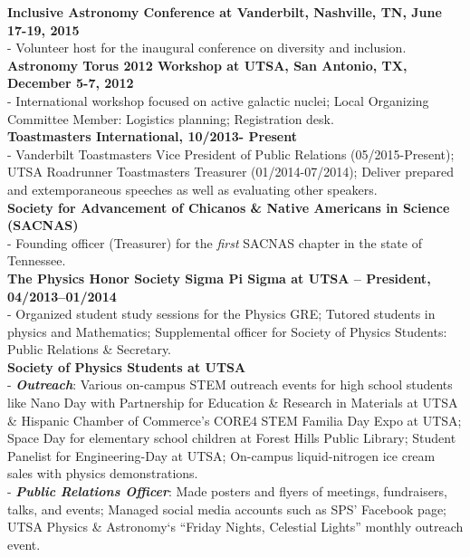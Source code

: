 \documentclass[letter,11pt]{article}
\begin{document}
\vskip 0.01in
\noindent
\textbf{Inclusive Astronomy Conference at Vanderbilt, Nashville, TN, June 17-19, 2015} \\
- Volunteer host for the inaugural conference on diversity and inclusion. \\

\vskip 0.01in
\noindent
\textbf{Astronomy Torus 2012 Workshop at UTSA, San Antonio, TX, December 5-7, 2012} \\
- International workshop focused on active galactic nuclei; Local Organizing Committee Member: Logistics planning; Registration desk. \\

\vskip 0.01in
\noindent
\textbf{Toastmasters International, 10/2013- Present} \\
- Vanderbilt Toastmasters Vice President of Public Relations (05/2015-Present); UTSA Roadrunner Toastmasters Treasurer (01/2014-07/2014); Deliver prepared and extemporaneous speeches as well as evaluating other speakers. \\

\vskip 0.01in
\noindent
\textbf{Society for Advancement of Chicanos \& Native Americans in Science (SACNAS)} \\
- Founding officer (Treasurer) for the {\it first} SACNAS chapter in the state of Tennessee. \\

\vskip 0.01in
\noindent
\textbf{The Physics Honor Society \text{\textbar} Sigma Pi Sigma at UTSA – President, 04/2013--01/2014} \\
- Organized student study sessions for the Physics GRE; Tutored students in physics and Mathematics; Supplemental officer for Society of Physics Students: Public Relations \& Secretary. \\

\vskip 0.01in
\noindent
\textbf{Society of Physics Students at UTSA} \\
- \textbf{\textit{Outreach}}: Various on-campus STEM outreach events for high school students like Nano Day with Partnership for Education \& Research in Materials at UTSA \& Hispanic Chamber of Commerce’s CORE4 STEM Familia Day Expo at UTSA; Space Day for elementary school children at Forest Hills Public Library; Student Panelist for Engineering-Day at UTSA; On-campus liquid-nitrogen ice cream sales with physics demonstrations. \\
- \textbf{\textit{Public Relations Officer}}: Made posters and flyers of meetings, fundraisers, talks, and events; Managed social media accounts such as SPS’ Facebook page; UTSA Physics \& Astronomy`s “Friday Nights, Celestial Lights” monthly outreach event. \\
\end{document}
